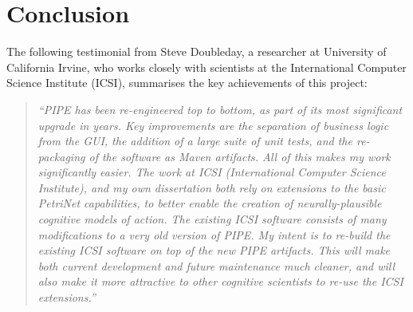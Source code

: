 \section{Conclusion}
The following testimonial from Steve Doubleday, a researcher at University of California Irvine, who works closely with scientists at the International Computer Science Institute (ICSI), summarises the key achievements of this project:\begin{quote}
\singlespacing
    \textit{``PIPE has been re-engineered top to bottom, as part of its most significant upgrade in years. Key improvements are the separation of business logic from the GUI, the addition of a large suite of unit tests, and the re-packaging of the software as Maven artifacts.  All of this makes my work significantly easier. The work at ICSI (International Computer Science Institute), and my own dissertation both rely on extensions to the basic PetriNet capabilities, to better enable the creation of neurally-plausible cognitive models of action. The existing ICSI software consists of many modifications to a very old version of PIPE. My intent is to re-build the existing ICSI software on top of the new PIPE artifacts. This will make both current development and future maintenance much cleaner, and will also make it more attractive to other cognitive scientists to re-use the ICSI extensions.''}
\end{quote}